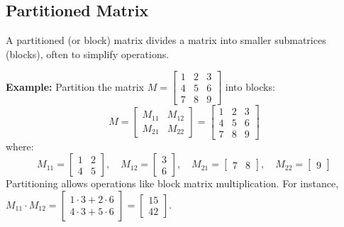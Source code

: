 \documentclass{article}
\begin{document}
\subsection{Partitioned Matrix}
A partitioned (or block) matrix divides a matrix into smaller submatrices (blocks), often to simplify operations.

\textbf{Example:}
Partition the matrix \( M = \begin{bmatrix}
1 & 2 & 3 \\
4 & 5 & 6 \\
7 & 8 & 9
\end{bmatrix} \) into blocks:
\[
M = \begin{bmatrix}
M_{11} & M_{12} \\
M_{21} & M_{22}
\end{bmatrix} 
= \left[
\begin{array}{cc|c}
1 & 2 & 3 \\
4 & 5 & 6 \\ \hline
7 & 8 & 9
\end{array}
\right]
\]
where:
\[
M_{11} = \begin{bmatrix}1 & 2 \\ 4 & 5\end{bmatrix},\quad
M_{12} = \begin{bmatrix}3 \\ 6\end{bmatrix},\quad
M_{21} = \begin{bmatrix}7 & 8\end{bmatrix},\quad
M_{22} = \begin{bmatrix}9\end{bmatrix}
\]
Partitioning allows operations like block matrix multiplication. For instance, \( M_{11} \cdot M_{12} = \begin{bmatrix}1\cdot3 + 2\cdot6 \\ 4\cdot3 + 5\cdot6\end{bmatrix} = \begin{bmatrix}15 \\ 42\end{bmatrix} \).
\end{document}
